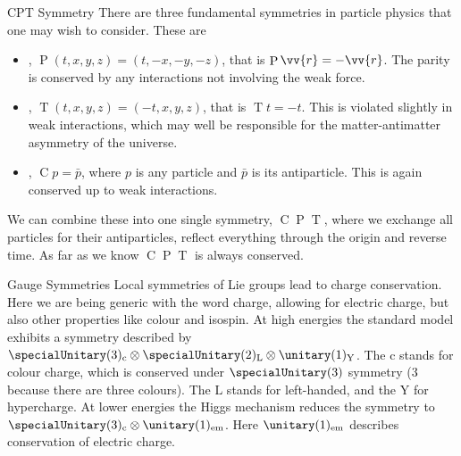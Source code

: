 \documentclass[fleqn]{NotesClass}
\newcommand*{\directproduct}{\otimes}
\DeclareMathOperator{\Csym}{C}
\DeclareMathOperator{\Psym}{P}
\DeclareMathOperator{\Tsym}{T}
\begin{document}
    \begin{exm}{CPT Symmetry}{}
        There are three fundamental symmetries in particle physics that one may wish to consider.
        These are
        \begin{itemize}
            \item {}, \(\Psym(t, x, y, z) = (t, -x, -y, -z)\), that is \(\Psym \vv{r} = -\vv{r}\).
            The parity is conserved by any interactions not involving the weak force.
            \item {}, \(\Tsym(t, x, y, z) = (-t, x, y, z)\), that is \(\Tsym t = -t\).
            This is violated slightly in weak interactions, which may well be responsible for the matter-antimatter asymmetry of the universe.
            \item {}, \(\Csym p = \bar{p}\), where \(p\) is any particle and \(\bar{p}\) is its antiparticle.
            This is again conserved up to weak interactions.
        \end{itemize}
        We can combine these into one single symmetry, \({\Csym}{\Psym}{\Tsym}\), where we exchange all particles for their antiparticles, reflect everything through the origin and reverse time. 
        As far as we know \({\Csym}{\Psym}{\Tsym}\) is always conserved.
    \end{exm}
    
    \begin{exm}{Gauge Symmetries}{}
        Local symmetries of Lie groups lead to charge conservation.
        Here we are being generic with the word charge, allowing for electric charge, but also other properties like colour and isospin.
        At high energies the standard model exhibits a symmetry described by \(\specialUnitary(3)_{\mathrm{c}} \directproduct \specialUnitary(2)_{\mathrm{L}} \directproduct \unitary(1)_{\mathrm{Y}}\).
        The \(\mathrm{c}\) stands for colour charge, which is conserved under \(\specialUnitary(3)\) symmetry (3 because there are three colours).
        The \(\mathrm{L}\) stands for left-handed, and the \(\mathrm{Y}\) for hypercharge.
        At lower energies the Higgs mechanism reduces the symmetry to \(\specialUnitary(3)_{\mathrm{c}} \directproduct \unitary(1)_{\mathrm{em}}\).
        Here \(\unitary(1)_{\mathrm{em}}\) describes conservation of electric charge.
    \end{exm}
\end{document}

